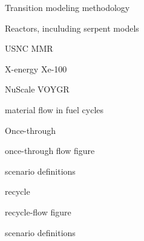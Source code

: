 \documentclass{report}
\begin{document}
\begin{outline}
\item Transition modeling methodology
\begin{outline}
    \item Reactors, inculuding serpent models
    \begin{outline}
        \item USNC MMR \cite{hussain_advances_2018}
        \item X-energy Xe-100 \cite{harlan_x-energy_2018}
        \item NuScale VOYGR \cite{nuscale_chapter_2020,suk_simulation_2021}
    \end{outline}
    \item material flow in fuel cycles
    \begin{outline}
        \item Once-through
        \begin{outline}
            \item once-through flow figure
            \item scenario definitions
        \end{outline}
        \item recycle 
        \begin{outline}
            \item recycle-flow figure          
            \item scenario definitions
        \end{outline}

    \end{outline}
\end{outline}


\end{outline}
\end{document}
